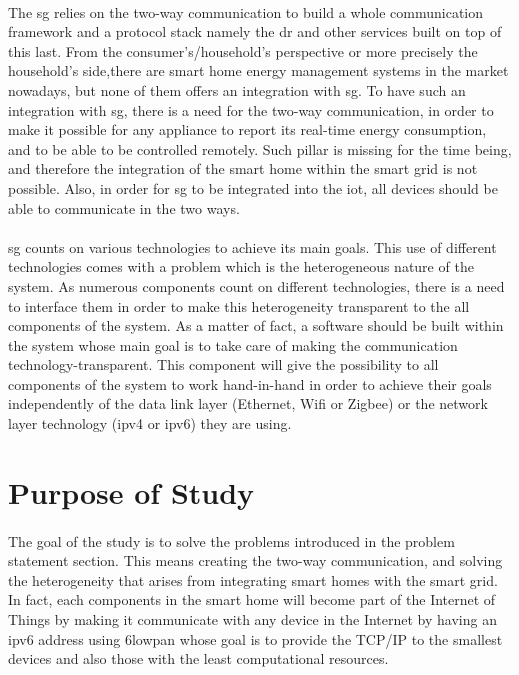 \documentclass[oneside,12pt,a4paper,final]{book}
\begin{document}
\paragraph{}
The  \gls{sg} relies on the two-way communication to build a whole communication framework and a protocol stack namely the \gls{dr} and other services built on top of this last. From the consumer's/household's perspective or more precisely the household's side,there are smart home energy management systems in the market nowadays, but none of them offers an integration with \gls{sg}. To have such an integration with \gls{sg}, there is a need for the two-way communication, in order to make it possible for any appliance to report its real-time energy consumption, and to be able to be controlled remotely. Such pillar is missing for the time being, and therefore the integration of the smart home within the smart grid is not possible. Also, in order for \gls{sg} to be integrated into the \gls{iot}, all devices should be able to communicate in the two ways.
\paragraph{}
\gls{sg} counts on various technologies to achieve its main goals. This use of different technologies comes with a problem which is the heterogeneous nature of the system. As numerous components count on different technologies, there is a need to interface them in order to make this heterogeneity transparent to the all components of the system. As a matter of fact, a software should be built within the system whose main goal is to take care of making the communication technology-transparent. This component will give the possibility to all components of the system to work hand-in-hand in order to achieve their goals independently of the data link layer (Ethernet, Wifi or Zigbee) or the network layer technology (\gls{ipv4} or \gls{ipv6}) they are using.

\section{Purpose of Study}
 \paragraph{}
The goal of the study is to solve the problems introduced in the problem statement section. This means creating the two-way communication, and solving the heterogeneity that arises from integrating smart homes with the smart grid. In fact, each components in the smart home will become part of the Internet of Things by making it communicate with any device in the Internet by having an \gls{ipv6} address using \gls{6lowpan} whose goal is to provide the TCP/IP to the smallest devices and also those with the least computational resources.
\end{document}
